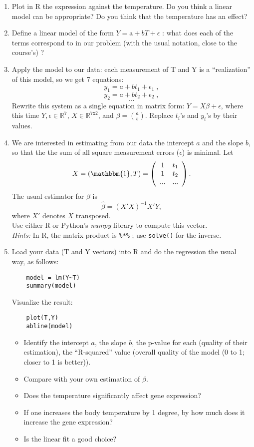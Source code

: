 \documentclass[a4paper,11pt]{article}
\begin{document}
\begin{enumerate}
\item Plot in R the expression against the temperature. Do you think a linear model can be appropriate?
Do you think that the temperature has an effect?
\item Define a linear model of the form $Y = \text{a} + b T + \epsilon$ : what does each of the terms 
correspond to in our problem (with the usual notation, close to the course's) ?
\item Apply the model to our data: each measurement of T and Y is a ``realization'' of this model, so we get 7 equations:
$$y_1 = a + b t_1 + \epsilon_1 \; ,$$
$$y_2 = a + b t_2 + \epsilon_2 \; ,$$
$$...$$
Rewrite this system as a single equation in matrix form: $Y = X\beta + \epsilon$, where this time
$Y,\epsilon \in \mathbb{R}^7$, $X \in \mathbb{R}^{7\text{x}2}$, and $\beta={a \choose b}$.
Replace $t_i$'s and $y_i$'s by their values. \\

\item We are interested in estimating from our data the intercept $a$ and the slope $b$, 
so that the the sum of all square measurement errors ($\epsilon$) is minimal. 
Let 
$$
X = (\mathbbm{1}, T) = \left( 
\begin{array}{cc}
1 & t_1 \\
1 & t_2 \\
... & ...
\end{array}
\right) .
$$
The usual estimator for $\beta$ is 
$$\hat{\beta} = (X'X)^{-1}X'Y ,$$
where $X'$ denotes $X$ transposed.\\
Use either R or Python's \textit{numpy} library to compute this vector. \\
\textit{Hints:} In R, the matrix product is \texttt{\%*\%} ; use \texttt{solve()} for the inverse.

\item Load your data (T and Y vectors) into R and do the regression the usual way, as follows: 
\begin{verbatim}
	model = lm(Y~T)
	summary(model)
\end{verbatim}	
Visualize the result:
\begin{verbatim}
	plot(T,Y)
	abline(model)
\end{verbatim}
\begin{itemize}
	\item Identify the intercept $a$, the slope $b$, the p-value for each (quality of 
		their estimation), the ``R-squared'' value (overall quality of the model (0 to 1; closer to 1 is better)).
	\item Compare with your own estimation of $\beta$. 
	\item Does the temperature significantly affect gene expression? 
	\item If one increases the body temperature by 1 degree, by how much does it increase the gene expression?
	\item Is the linear fit a good choice?
\end{itemize}

\end{enumerate}
\end{document}
